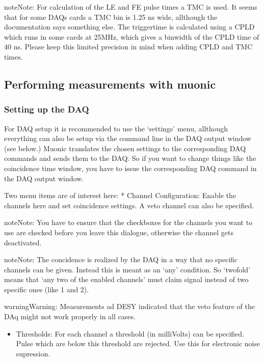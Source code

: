 \documentclass[letterpaper,10pt,english]{sphinxmanual}
\begin{document}
\begin{notice}{note}{Note:}
For calculation of the LE and FE pulse times a TMC is used. It seems that for some DAQs cards a TMC bin is 1.25 ns wide, allthough the documentation says something else.
The triggertime is calculated using a CPLD which runs in some cards at 25MHz, which gives a binwidth of the CPLD time of 40 ns.
Please keep this limited precision in mind when adding CPLD and TMC times.
\end{notice}


\subsection{Performing measurements with muonic}
\label{tutorial:performing-measurements-with-muonic}

\subsubsection{Setting up the DAQ}
\label{tutorial:setting-up-the-daq}
For DAQ setup it is recommended to use the `settings' menu, allthough everything can also be setup via the command line in the DAQ output window (see below.)
Muonic translates the chosen settings to the corresponding DAQ commands and sends them to the DAQ. So if you want to change things like the coincidence time window, you have to issue the corresponding DAQ command in the DAQ output window.

Two menu items are of interest here:
* Channel Configuration: Enable the channels here and set coincidence settings. A veto channel can also be specified.

\begin{notice}{note}{Note:}
You have to ensure that the checkboxes for the channels you want to use are checked before you leave this dialogue, otherwise the channel gets deactivated.
\end{notice}

\begin{notice}{note}{Note:}
The concidence is realized by the DAQ in a way that no specific channels can be given. Instead this is meant as an `any' condition.
So `twofold' means that `any two of the enabled channels' must claim signal instead of two specific ones (like 1 and 2).
\end{notice}

\begin{notice}{warning}{Warning:}
Measurements ad DESY indicated that the veto feature of the DAq might not work properly in all cases.
\end{notice}
\begin{itemize}
\item {} 
Thresholds: For each channel a threshold (in milliVolts) can be specified. Pulse which are below this threshold are rejected. Use this for electronic noise supression.

\end{itemize}
\end{document}
